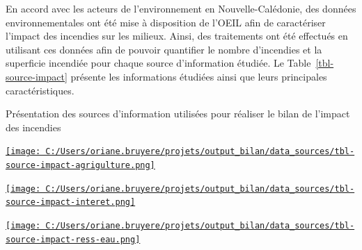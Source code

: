 \documentclass[
  11pt,
  letterpaper,
]{scrreprt}
\begin{document}

En accord avec les acteurs de l'environnement en Nouvelle-Calédonie, des
données environnementales ont été mise à disposition de l'OEIL afin de
caractériser l'impact des incendies sur les milieux. Ainsi, des
traitements ont été effectués en utilisant ces données afin de pouvoir
quantifier le nombre d'incendies et la superficie incendiée pour chaque
source d'information étudiée. Le Table~\ref{tbl-source-impact} présente
les informations étudiées ainsi que leurs principales caractéristiques.

\newpage{}

\recalctypearea

\newpage
{}

\begin{table}

\caption{\label{tbl-source-impact}Présentation des sources d'information
utilisées pour réaliser le bilan de l'impact des incendies}


\end{table}%

\recalctypearea

\newpage
{}

\href{C:/Users/oriane.bruyere/projets/output_bilan/data_sources/tbl-source-impact-agrigulture.html}{\texttt{[image: C:/Users/oriane.bruyere/projets/output\_bilan/data\_sources/tbl-source-impact-agrigulture.png]}}

\href{C:/Users/oriane.bruyere/projets/output_bilan/data_sources/tbl-source-impact-interet.html}{\texttt{[image: C:/Users/oriane.bruyere/projets/output\_bilan/data\_sources/tbl-source-impact-interet.png]}}

\href{C:/Users/oriane.bruyere/projets/output_bilan/data_sources/tbl-source-impact-ress-eau.html}{\texttt{[image: C:/Users/oriane.bruyere/projets/output\_bilan/data\_sources/tbl-source-impact-ress-eau.png]}}
\end{document}
